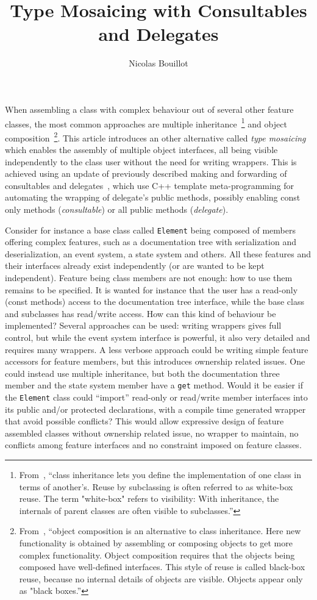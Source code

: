 \documentclass{article}
\newcommand{\gofInheritence}{ ``class inheritance lets you define the implementation of one class in terms of another's. Reuse by subclassing is often referred to as white-box reuse. The term "white-box" refers to visibility: With inheritance, the internals of parent classes are often visible to subclasses.''}
\newcommand{\gofComposition}{``object composition is an alternative to class inheritance. Here new functionality is obtained by assembling or composing objects to get more complex functionality. Object composition requires that the objects being composed have well-defined interfaces. This style of reuse is called black-box reuse, because no internal details of objects are visible. Objects appear only as "black boxes.''}
\begin{document}
\title{Type Mosaicing with Consultables and Delegates}
\author{Nicolas Bouillot}
\maketitle

When assembling a class with complex behaviour out of several other feature classes, the most common approaches are multiple inheritance~\footnote{From~\cite{1995gamma}, \gofInheritence} and object composition~\footnote{From~\cite{1995gamma}, \gofComposition}. This article introduces an other alternative called \textit{type mosaicing} which enables the assembly of multiple object interfaces, all being visible independently to the class user without the need for writing wrappers. This is achieved using an update of previously described making and forwarding of consultables and delegates~\cite{2015consultable}, which use C++ template meta-programming for automating the wrapping of delegate's public methods, possibly enabling const only methods (\textit{consultable}) or all public methods (\textit{delegate}).

Consider for instance a base class called \texttt{Element} being composed of members offering complex features, such as a documentation tree with serialization and deserialization, an event system, a state system and others. All these features and their interfaces already exist independently (or are wanted to be kept independent). Feature being class members are not enough: how to use them remains to be specified. It is wanted for instance that the user has a read-only (const methods) access to the documentation tree interface, while the base class and subclasses has read/write access. How can this kind of behaviour be implemented? Several approaches can be used: writing wrappers gives full control, but while the event system interface is powerful, it also very detailed and requires many wrappers. A less verbose approach could be writing simple feature accessors for feature members, but this introduces ownership related issues. One could instead use multiple inheritance, but both the documentation three member and the state system member have a \texttt{get} method. Would it be easier if the \texttt{Element} class could ``import'' read-only or read/write member interfaces into its public and/or protected declarations, with a compile time generated wrapper that avoid possible conflicts? This would allow expressive design of feature assembled classes without ownership related issue, no wrapper to maintain, no conflicts among feature interfaces and no constraint imposed on feature classes.
\end{document}
